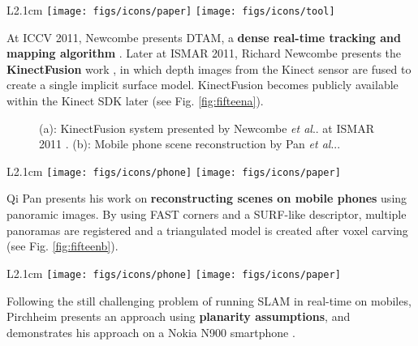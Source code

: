 \documentclass[12pt,a4paper]{article}
\makeatletter
\DeclareRobustCommand\onedot{\futurelet\@let@token\@onedot}
\def\@onedot{\ifx\@let@token.\else.\null\fi\xspace}
\def\etal{\emph{et al}\onedot}
\makeatother
\begin{document}
\vspace{0.1in}

\begin{wrapfigure}{L}{2.1cm}
	\vspace{-10pt}	
	\texttt{[image: figs/icons/paper]}
	\texttt{[image: figs/icons/tool]}
	\vspace{-20pt}		
\end{wrapfigure}
\noindent At ICCV 2011, Newcombe presents DTAM, a \textbf{dense real-time tracking and mapping algorithm} \cite{Newcombe11a}. Later at ISMAR 2011, Richard Newcombe presents the \textbf{KinectFusion} work \cite{Newcombe11b}, in which depth images from the Kinect sensor are fused to create a single implicit surface model. KinectFusion becomes publicly available within the Kinect SDK later  (see Fig. \ref{fig:fifteena}).

\begin{figure}[tbp]
\centering
\vspace{-10pt}
 \hfill 
{}
\vspace{-10pt}
\caption{ (a): KinectFusion system presented by Newcombe \etal at ISMAR 2011 \cite{Newcombe11b}. (b): Mobile phone scene reconstruction by Pan \etal \cite{Pan11}.}
\label{fig:fifteen}
\end{figure}

\vspace{0.1in}

\begin{wrapfigure}{L}{2.1cm}
	\vspace{-15pt}	
	\texttt{[image: figs/icons/phone]}	
	\texttt{[image: figs/icons/paper]}
	\vspace{-30pt}		
\end{wrapfigure}
\noindent Qi Pan presents his work on \textbf{reconstructing scenes on mobile phones} using panoramic images. By using FAST corners and a SURF-like descriptor, multiple panoramas are registered and a triangulated model is created after voxel carving \cite{Pan11} (see Fig. \ref{fig:fifteenb}).

\vspace{0.1in}

\begin{wrapfigure}{L}{2.1cm}
	\vspace{-15pt}	
	\texttt{[image: figs/icons/phone]}	
	\texttt{[image: figs/icons/paper]}
	\vspace{-25pt}		
\end{wrapfigure}
\noindent Following the still challenging problem of running SLAM in real-time on mobiles, Pirchheim presents an approach using \textbf{planarity assumptions}, and demonstrates his approach on a Nokia N900 smartphone \cite{Pirchheim11}.
\end{document}
